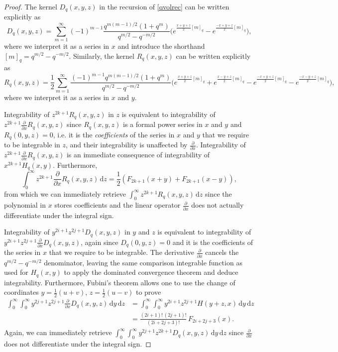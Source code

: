 \documentclass[a4paper]{article}
\theoremstyle{plain}
\theoremstyle{definition}
\newcommand{\dd}{\mathrm{d}}
\begin{document}
\begin{proof}
The kernel $D_q(x,y,z)$ in the recursion of \cref{qvolrec} can be written explicitly as
\[
D_q(x,y,z) = \sum_{m=1}^\infty (-1)^{m-1} \frac{q^{m(m-1)/2}(1+q^m)}{q^{m/2}-q^{-m/2}}\Big( e^{\frac{x+y+z}{2} [m]_q} - e^{\frac{-x+y+z}{2} [m]_q} \Big),
\]
where we interpret it as a series in $x$ and introduce the shorthand $[m]_q = q^{m/2}-q^{-m/2}$. Similarly, the kernel $R_q(x,y,z)$ can be written explicitly as
\[
R_q(x,y,z)=\frac{1}{2}\sum_{m=1}^\infty\frac{(-1)^{m-1}q^{m(m-1)/2}(1+q^m)}{q^{m/2}-q^{-m/2}}\Big(e^{\frac{x+y+z}{2} [m]_q}+e^{\frac{x-y+z}{2} [m]_q}-e^{\frac{-x+y+z}{2} [m]_q}-e^{\frac{-x-y+z}{2} [m]_q}\Big),
\]
where we interpret it as a series in $x$ and $y$.


Integrability of $z^{2k+1}R_q(x,y,z)$ in $z$ is equivalent to integrability of $z^{2k+1}\frac{\partial}{\partial x}R_q(x,y,z)$ since $R_q(x,y,z)$ is a formal power series in $x$ and $y$ and $R_q(0,y,z)=0$, i.e. it is the {\em coefficients} of the series in $x$ and $y$ that we require to be integrable in $z$, and their integrability is unaffected by $\frac{\partial}{\partial x}$. Integrability of $z^{2k+1}\frac{\partial}{\partial x}R_q(x,y,z)$ is an immediate consequence of integrability of $x^{2k+1}H_q(x,y)$. Furthermore,
\[
\int_0^\infty \!\! z^{2k+1}\frac{\partial}{\partial x}R_q(x,y,z) \, \dd z=\frac{1}{2}(F_{2k+1}(x+y)+F_{2k+1}(x-y)),
\]
from which we can immediately retrieve $\int_0^\infty \! z^{2k+1}R_q(x,y,z) \, \dd z$ since the polynomial in $x$ stores coefficients and the linear operator $\frac{\partial}{\partial x}$ does not actually differentiate under the integral sign.


Integrability of $y^{2i+1}z^{2j+1}D_q(x,y,z)$ in $y$ and $z$ is equivalent to integrability of $y^{2i+1}z^{2j+1}\frac{\partial}{\partial x}D_q(x,y,z)$, again since $D_q(0,y,z)=0$ and it is the coefficients of the series in $x$ that we require to be integrable. The derivative $\frac{\partial}{\partial x}$
cancels the $q^{m/2}-q^{-m/2}$ denominator, leaving the same comparison integrable function as used for $H_q(x,y)$ to apply the dominated convergence theorem and deduce integrability. Furthermore, Fubini's theorem allows one to use the change of coordinates $y=\frac{1}{2}(u+v)$, $z=\frac{1}{2}(u-v)$ to prove
\begin{align*}
\int_0^\infty \!\! \int_0^\infty \!\! y^{2j+1} z^{2j+1} \frac{\partial}{\partial x} D_q(x,y,z) \, \dd y \, \dd z &= \int_0^\infty \!\! \int_0^\infty \!\! y^{2i+1} z^{2j+1} H(y+z,x) \, \dd y \, \dd z \\
&= \frac{(2i+1)! \, (2j+1)!}{(2i+2j+3)!} \, F_{2i+2j+3}(x).
\end{align*}
Again, we can immediately retrieve $\int_0^\infty \! \int_0^\infty \! y^{2j+1} z^{2k+1} D_q(x,y,z) \, \dd y \, \dd z$ since $\frac{\partial}{\partial x}$ does not differentiate under the integral sign.



\end{proof}
\end{document}
